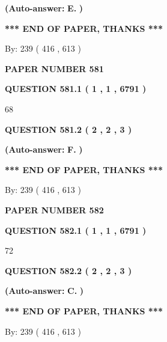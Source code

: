 \documentclass{ctexart}
\begin{document}
 
{\textbf{(Auto-answer:}}
{\textbf{\large{
E.}}}
{\textbf{)}}
 
 
   
   
   
   
\vspace{1.0in} 
{\textbf{\large{ *** END OF PAPER, THANKS *** }}} 
   
   
\hspace{1.0in} By: 
 239 ( 416 ,  613 )
   
   
   
   
\newpage 
\setcounter{page}{ 
   581001 } 
   
   
 {\textbf{ \Large{ PAPER NUMBER  581  }}}
   
   
   
   
  
  
{\textbf{\large{QUESTION
581.1 
 ( 1 , 1 , 6791 )
}}}

68
  
  
{\textbf{\large{QUESTION
581.2 
 ( 2 , 2 , 3 )
}}}
 
 
{\textbf{(Auto-answer:}}
{\textbf{\large{
F.}}}
{\textbf{)}}
 
 
   
   
   
   
\vspace{1.0in} 
{\textbf{\large{ *** END OF PAPER, THANKS *** }}} 
   
   
\hspace{1.0in} By: 
 239 ( 416 ,  613 )
   
   
   
   
\newpage 
\setcounter{page}{ 
   582001 } 
   
   
 {\textbf{ \Large{ PAPER NUMBER  582  }}}
   
   
   
   
  
  
{\textbf{\large{QUESTION
582.1 
 ( 1 , 1 , 6791 )
}}}

72
  
  
{\textbf{\large{QUESTION
582.2 
 ( 2 , 2 , 3 )
}}}
 
 
{\textbf{(Auto-answer:}}
{\textbf{\large{
C.}}}
{\textbf{)}}
 
 
   
   
   
   
\vspace{1.0in} 
{\textbf{\large{ *** END OF PAPER, THANKS *** }}} 
   
   
\hspace{1.0in} By: 
 239 ( 416 ,  613 )
   
   
   
\end{document}
